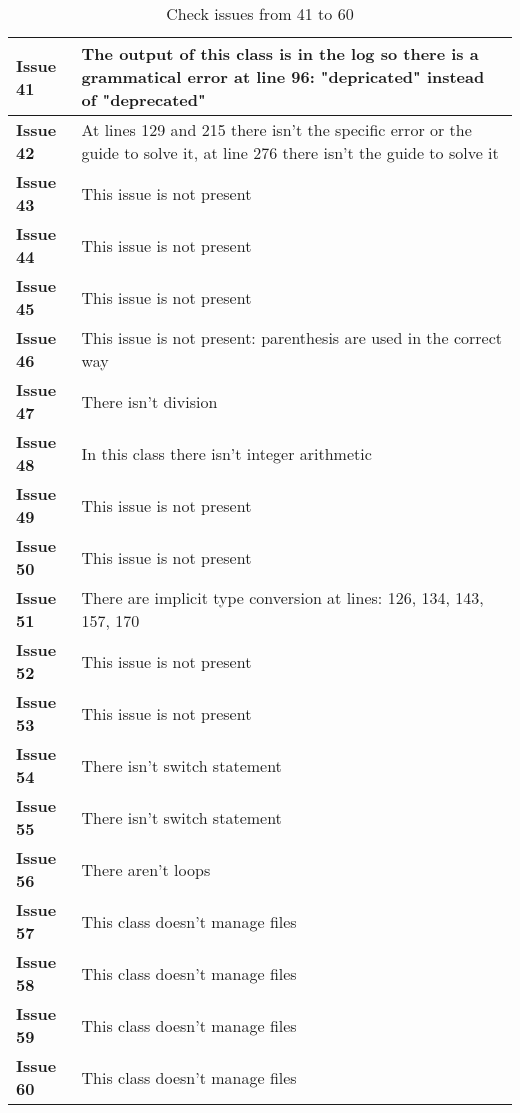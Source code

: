\begin{table}[htbp]
\begin{center}
\renewcommand{\arraystretch}{1.5}
\begin{tabular}{l|p{}}
\hline
\textbf{Issue 41} & The output of this class is in the log so there is a grammatical error at line 96: "depricated" instead of "deprecated"\\
\hline
\textbf{Issue 42} & At lines 129 and 215 there isn't the specific error or the guide to solve it, at line 276 there isn't the guide to solve it\\
\hline
\textbf{Issue 43} & This issue is not present\\
\hline
\textbf{Issue 44} & This issue is not present\\
\hline
\textbf{Issue 45} & This issue is not present\\
\hline
\textbf{Issue 46} & This issue is not present: parenthesis are used in the correct way\\
\hline
\textbf{Issue 47} & There isn't division\\
\hline
\textbf{Issue 48} & In this class there isn't integer arithmetic\\
\hline
\textbf{Issue 49} & This issue is not present\\
\hline
\textbf{Issue 50} & This issue is not present\\
\hline
\textbf{Issue 51} & There are implicit type conversion at lines: 126, 134, 143, 157, 170\\
\hline
\textbf{Issue 52} & This issue is not present\\
\hline
\textbf{Issue 53} & This issue is not present\\
\hline
\textbf{Issue 54} & There isn't switch statement\\
\hline
\textbf{Issue 55} & There isn't switch statement \\
\hline
\textbf{Issue 56} & There aren't loops\\
\hline
\textbf{Issue 57} & This class doesn't manage files\\
\hline
\textbf{Issue 58} & This class doesn't manage files\\
\hline
\textbf{Issue 59} & This class doesn't manage files\\
\hline
\textbf{Issue 60} & This class doesn't manage files\\
\hline
\end{tabular}
\caption{Check issues from 41 to 60}
\end{center}
\end{table}


